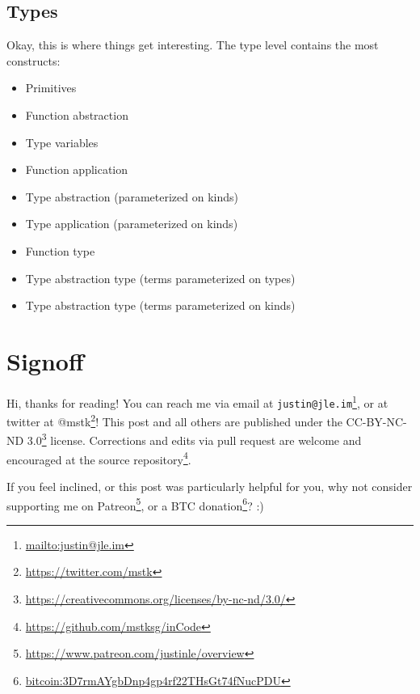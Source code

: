 \documentclass[]{article}
\renewcommand{\href}[2]{#2\footnote{\url{#1}}}
\begin{document}
\hypertarget{types}{%
\subsection{Types}\label{types}}

Okay, this is where things get interesting. The type level contains the most
constructs:

\begin{itemize}
\tightlist
\item
  Primitives
\item
  Function abstraction
\item
  Type variables
\item
  Function application
\item
  Type abstraction (parameterized on kinds)
\item
  Type application (parameterized on kinds)
\item
  Function type
\item
  Type abstraction type (terms parameterized on types)
\item
  Type abstraction type (terms parameterized on kinds)
\end{itemize}

\hypertarget{signoff}{%
\section{Signoff}\label{signoff}}

Hi, thanks for reading! You can reach me via email at
\href{mailto:justin@jle.im}{\nolinkurl{justin@jle.im}}, or at twitter at
\href{https://twitter.com/mstk}{@mstk}! This post and all others are published
under the \href{https://creativecommons.org/licenses/by-nc-nd/3.0/}{CC-BY-NC-ND
3.0} license. Corrections and edits via pull request are welcome and encouraged
at \href{https://github.com/mstksg/inCode}{the source repository}.

If you feel inclined, or this post was particularly helpful for you, why not
consider \href{https://www.patreon.com/justinle/overview}{supporting me on
Patreon}, or a \href{bitcoin:3D7rmAYgbDnp4gp4rf22THsGt74fNucPDU}{BTC donation}?
:)
\end{document}
